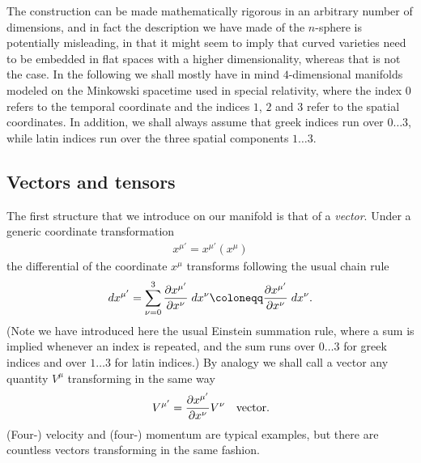 The construction can be made mathematically rigorous in an arbitrary number of
dimensions, and in fact the description we have made of the $n$-sphere is potentially
misleading, in that it might seem to imply that curved varieties need to be embedded
in flat spaces with a higher dimensionality, whereas that is not the case. In the
following we shall mostly have in mind $4$-dimensional manifolds modeled on the
Minkowski spacetime  used in special relativity, where the index $0$ refers to the
temporal coordinate and the indices $1$, $2$ and $3$ refer to the spatial coordinates.
In addition, we shall always assume that greek indices run over $0\ldots3$, while
latin indices run over the three spatial components $1\ldots 3$.


\subsection{Vectors and tensors}

The first structure that we introduce on our manifold is that of a \emph{vector}.
Under a generic coordinate transformation
\begin{align}
  x^{\mu'} = x^{\mu'}(x^\mu)
\end{align}
the differential of the coordinate $x^\mu$ transforms following the usual chain rule
\begin{align*}
  dx^{\mu'} = \sum_{\nu=0}^{3} \pdv{x^{\mu'}}{x^\nu} \diff{x^\nu} \coloneqq
  \pdv{x^{\mu'}}{x^\nu} \diff{x^\nu}.
\end{align*}
(Note we have introduced here the usual Einstein summation rule, where a sum is implied
whenever an index is repeated, and the sum runs over $0 \ldots 3$ for greek indices
and over $1 \ldots 3$ for latin indices.) By analogy we shall call a vector any quantity $V^\mu$
transforming in the same way
\begin{align}
  V^{\mu'} = \pdv{x^{\mu'}}{x^\nu} V^\nu \quad\text{vector}.
\end{align}
(Four-) velocity and (four-) momentum are typical examples, but there are countless
vectors transforming in the same fashion.

